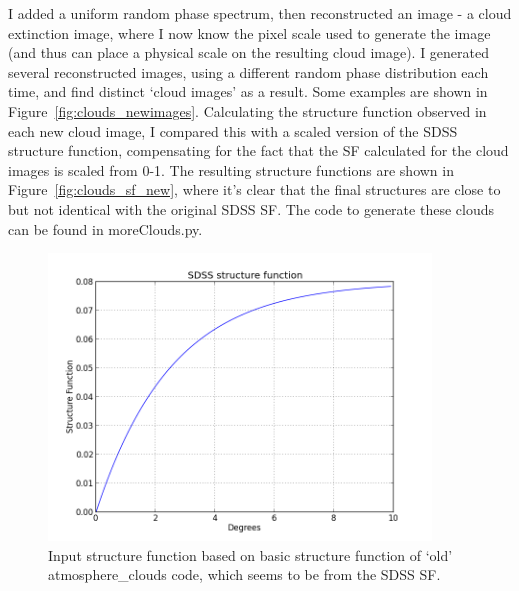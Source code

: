 \documentclass[11pt,preprint]{aastex}
\begin{document}
I added a uniform random phase spectrum, then reconstructed an image - a cloud extinction image, where I now know the pixel scale used to generate the image (and thus can place a physical scale on the resulting cloud image). I generated several reconstructed images, using a different random phase distribution each time, and find distinct `cloud images' as a result. Some examples are shown in Figure~\ref{fig:clouds_newimages}.  Calculating the structure function observed in each new cloud image, I compared this with a scaled version of the SDSS structure function, compensating for the fact that the SF calculated for the cloud images is scaled from 0-1. The resulting structure functions are shown in Figure~\ref{fig:clouds_sf_new}, where it's clear that the final structures are close to but not identical with the original SDSS SF. The code to generate these clouds can be found in moreClouds.py. 

\begin{figure}[htpb]
\centering
\includegraphics[width=4in]{clouds_sf_SDSS}
\caption{{\small
Input structure function based on basic structure function of `old' atmosphere\_clouds code, which seems to be from the SDSS SF.}}
\label{fig:sf_degrees}
\end{figure}
\end{document}
